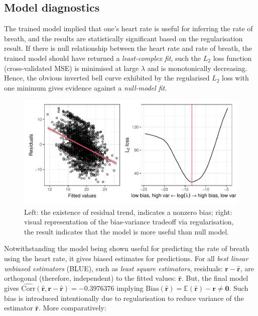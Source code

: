 \documentclass[
]{article}
\begin{document}
\newpage

\hypertarget{model-diagnostics}{%
\subsection{Model diagnostics}\label{model-diagnostics}}

The trained model implied that one's heart rate is useful for inferring
the rate of breath, and the results are statistically significant based
on the regularisation result. If there is null relationship between the
heart rate and rate of breath, the trained model should have returned a
\emph{least-complex fit}, such the \(L_2\) loss function
(cross-validated MSE) is minimised at large \(\lambda\) and is
monotonically decreasing. Hence, the obvious inverted bell curve
exhibited by the regularised \(L_2\) loss with one minimum gives
evidence against a \emph{null-model fit}.

\begin{figure}

{\centering \includegraphics{report_files/figure-latex/resid-check-1} 

}

\caption{Left: the existence of residual trend, indicates a nonzero bias; right: visual representation of the bias-variance tradeoff via regularisation, the result indicates that the model is more useful than null model.}\label{fig:resid-check}
\end{figure}

Notwithstanding the model being shown useful for predicting the rate of
breath using the heart rate, it gives biased estimates for predictions.
For all \emph{best linear unbiased estimators} (BLUE), such as
\emph{least square estimators}, residuals:
\(\mathbf{r} - \mathbf{\hat{r}}\), are orthogonal (therefore,
independent) to the fitted values: \(\mathbf{\hat{r}}\). But, the final
model gives
\(\hat{\text{Corr}}(\mathbf{\hat{r}}, \mathbf{r} - \mathbf{\hat{r}}) = -0.3976376\)
implying
\(\text{Bias}(\mathbf{\hat{r}}) = \mathbb{E}(\mathbf{\hat{r}}) - \mathbf{r} \neq \mathbf{0}\).
Such bias is introduced intentionally due to regularisation to reduce
variance of the estimator \(\mathbf{\hat{r}}\). More comparatively:
\end{document}
